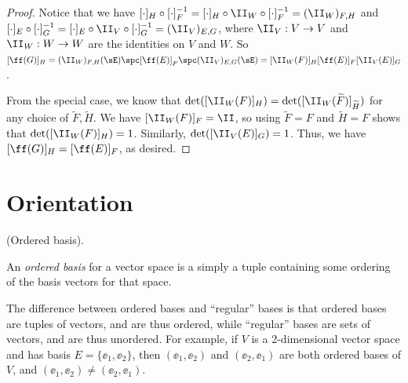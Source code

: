 \begin{proof}
{        Notice that we have $[\cdot]_H \circ [\cdot]_F^{-1} = [\cdot]_H \circ \II_W \circ [\cdot]_F^{-1} = (\II_W)_{F,H}$ and $[\cdot]_E \circ [\cdot]_G^{-1} = [\cdot]_E \circ \II_V \circ [\cdot]_G^{-1} = (\II_V)_{E,G}$, where $\II_V:V \rightarrow V$ and $\II_W:W \rightarrow W$ are the identities on $V$ and $W$. So $[\ff(G)]_H = (\II_W)_{F,H}(\sE) \spc [\ff(E)]_F \spc (\II_V)_{E,G}(\sE) = [\II_W(F)]_H [\ff(E)]_F [\II_V(E)]_G$.

        From the special case, we know that $\det([\II_W(F)]_H) = \det([\II_W(\widetilde{F})]_{\widetilde{H}})$ for any choice of $\widetilde{F}, \widetilde{H}$. We have $[\II_W(F)]_F = \II$, so using $\widetilde{F} = F$ and $\widetilde{H} = F$ shows that $\det([\II_W(F)]_H) = 1$. Similarly, $\det([\II_V(E)]_G) = 1$. Thus, we have $[\ff(G)]_H = [\ff(E)]_F$, as desired.
    }
\end{proof}

\newpage

\section*{Orientation}
\label{ch::lin_alg::section::orientation}


\begin{defn}
    (Ordered basis).
    
    An \textit{ordered basis} for a vector space is a simply a tuple containing some ordering of the basis vectors for that space.
    
    The difference between ordered bases and ``regular'' bases is that ordered bases are tuples of vectors, and are thus ordered, while ``regular'' bases are sets of vectors, and are thus unordered. For example, if $V$ is a 2-dimensional vector space and has basis $E = \{\ee_1, \ee_2\}$, then $(\ee_1, \ee_2)$ and $(\ee_2, \ee_1)$ are both ordered bases of $V$, and $(\ee_1, \ee_2) \neq (\ee_2, \ee_1)$.
\end{defn}

